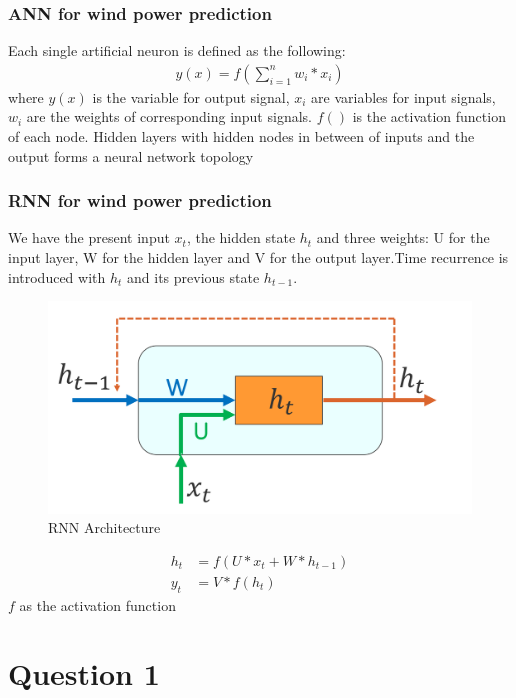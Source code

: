 \documentclass[a4paper, article, oneside, USenglish, IN5460]{memoir}
\begin{document}
\subsection{ANN for wind power prediction}
Each single artificial neuron is defined as the following: 
\begin{equation}
\begin{aligned}
y(x) = f(\sum_{i=1}^{n} w_i*x_i)
\end{aligned}
\end{equation}
where $y(x)$ is the variable for output signal, $x_i$ are variables for input signals, $w_i$ are the weights of corresponding input signals. $f()$ is the activation function of each node. Hidden layers with hidden nodes in between of inputs and the output forms a neural network topology
\newline

\subsection{RNN  for wind power prediction}
We have the present input $x_t$,  the hidden state $h_t$ and three weights: U for the input layer, W for the hidden layer and V for the output layer.Time recurrence is introduced with $h_t$ and its previous state $h_{t-1}$. 

\begin{figure}[H]
\centering
\includegraphics[width=0.8\linewidth]{fig/rnn.png}
\caption{\label{fig:q41} RNN Architecture}
\end{figure}

\begin{equation}
\begin{aligned}
h_t &=f(U*x_t +W*h_{t-1})\\
y_t &= V*f(h_t)

\end{aligned}
\end{equation}
\newline
$f$ as the activation function
\chapter*{Question 1}
\end{document}
